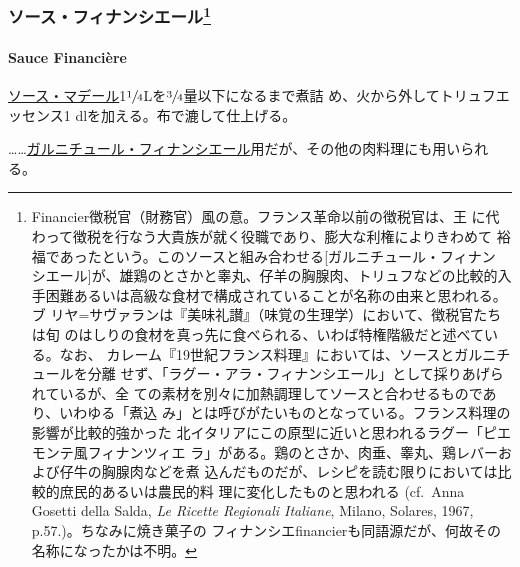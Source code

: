 \hypertarget{ux30bdux30fcux30b9ux30d5ux30a3ux30caux30f3ux30b7ux30a8ux30fcux30eb34}{%
\subsubsection[ソース・フィナンシエール]{\texorpdfstring{ソース・フィナンシエール\footnote{Financier徴税官（財務官）風の意。フランス革命以前の徴税官は、王
  に代わって徴税を行なう大貴族が就く役職であり、膨大な利権によりきわめて
  裕福であったという。このソースと組み合わせる{[}ガルニチュール・フィナン
  シエール{]}が、雄鶏のとさかと睾丸、仔羊の胸腺肉、トリュフなどの比較的入
  手困難あるいは高級な食材で構成されていることが名称の由来と思われる。ブ
  リヤ=サヴァランは『美味礼讃』（味覚の生理学）において、徴税官たちは旬
  のはしりの食材を真っ先に食べられる、いわば特権階級だと述べている。なお、
  カレーム『19世紀フランス料理』においては、ソースとガルニチュールを分離
  せず、「ラグー・アラ・フィナンシエール」として採りあげられているが、全
  ての素材を別々に加熱調理してソースと合わせるものであり、いわゆる「煮込
  み」とは呼びがたいものとなっている。フランス料理の影響が比較的強かった
  北イタリアにこの原型に近いと思われるラグー「ピエモンテ風フィナンツィエ
  ラ」がある。鶏のとさか、肉垂、睾丸、鶏レバーおよび仔牛の胸腺肉などを煮
  込んだものだが、レシピを読む限りにおいては比較的庶民的あるいは農民的料
  理に変化したものと思われる (cf.~Anna Gosetti della Salda, \emph{Le
  Ricette Regionali Italiane}, Milano, Solares, 1967,
  p.57.)。ちなみに焼き菓子の
  フィナンシエfinancierも同語源だが、何故その名称になったかは不明。}}{ソース・フィナンシエール}}\label{ux30bdux30fcux30b9ux30d5ux30a3ux30caux30f3ux30b7ux30a8ux30fcux30eb34}}

\hypertarget{sauce-financiere}{%
\paragraph{Sauce Financière}\label{sauce-financiere}}


\protect\hyperlink{sauce-madere}{ソース・マデール}1\(\sfrac{1}{4}\)Lを\(\sfrac{3}{4}\)量以下になるまで煮詰
め、火から外してトリュフエッセンス1 dlを加える。布で漉して仕上げる。

\ldots{}\ldots{}\href{}{ガルニチュール・フィナンシエール}用だが、その他の肉料理にも用いられる。

